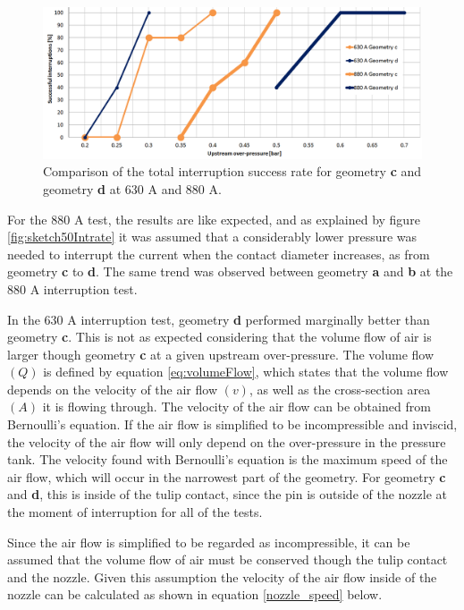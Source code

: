 \documentclass[10pt,b5paper,twoside]{article}
\begin{document}
\begin{figure}[H]
\centering
\includegraphics[scale=0.5, angle =90 ]{Bilder/Results/compGeoCandDNew.PNG}
\caption{Comparison of the total interruption success rate for geometry \textbf{c} and geometry \textbf{d} at 630 A and 880 A.} \label{fig:compgeoCandDAllcurrents}
\end{figure}

For the 880 A test, the results are like expected, and as explained by figure \ref{fig:sketch50Intrate} it was assumed that a considerably lower pressure was needed to interrupt the current when the contact diameter increases, as from geometry \textbf{c} to \textbf{d}. The same trend was observed between geometry \textbf{a} and \textbf{b} at the 880 A interruption test.

In the 630 A interruption test, geometry \textbf{d} performed marginally better than geometry \textbf{c}. This is not as expected considering that the volume flow of air is larger though geometry \textbf{c} at a given upstream over-pressure. The volume flow $(Q)$ is defined by equation \eqref{eq:volumeFlow}, which states that the volume flow depends on the velocity of the air flow $(v)$, as well as the cross-section area $(A)$ it is flowing through. The velocity of the air flow can be obtained from Bernoulli's equation. If the air flow is simplified to be incompressible and inviscid, the velocity of the air flow will only depend on the over-pressure in the pressure tank. The velocity found with Bernoulli's equation is the maximum speed of the air flow, which will occur in the narrowest part of the geometry. For geometry \textbf{c} and \textbf{d}, this is inside of the tulip contact, since the pin is outside of the nozzle at the moment of interruption for all of the tests.

Since the air flow is simplified to be regarded as incompressible, it can be assumed that the volume flow of air must be conserved though the tulip contact and the nozzle. Given this assumption the velocity of the air flow inside of the nozzle can be calculated as shown in equation \eqref{nozzle_speed} below.
\end{document}
